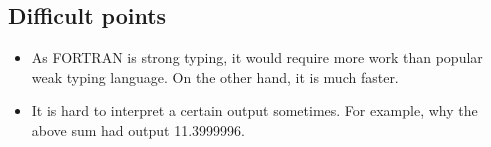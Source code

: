 \documentclass[11pt]{article}
\begin{document}
\subsection{Difficult points}
\begin{itemize}
    \item As FORTRAN is strong typing, it would require more work than popular weak typing language. On the other hand, it is much faster.
    \item It is hard to interpret a certain output sometimes. For example, why the above sum had output 11.3999996. 
\end{itemize}
\end{document}
